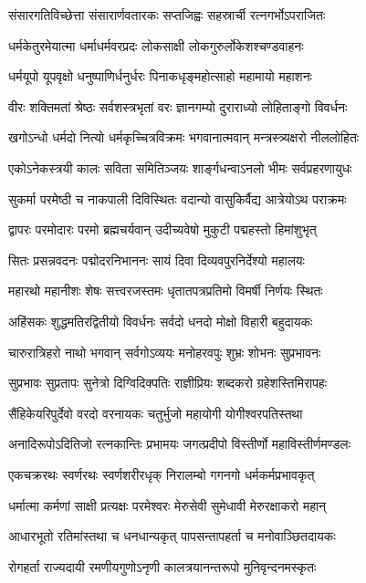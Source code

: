 \twolineshloka
{संसारगतिविच्छेत्ता संसारार्णवतारकः}
{सप्तजिह्वः सहस्रार्ची रत्नगर्भोऽपराजितः}%

\twolineshloka
{धर्मकेतुरमेयात्मा धर्माधर्मवरप्रदः}
{लोकसाक्षी लोकगुरुर्लोकेशश्चण्डवाहनः}%

\twolineshloka
{धर्मयूपो यूपवृक्षो धनुष्पाणिर्धनुर्धरः}
{पिनाकधृङ्महोत्साहो महामायो महाशनः}%

\twolineshloka
{वीरः शक्तिमतां श्रेष्ठः सर्वशस्त्रभृतां वरः}
{ज्ञानगम्यो दुराराध्यो लोहिताङ्गो विवर्धनः}%

\twolineshloka
{खगोऽन्धो धर्मदो नित्यो धर्मकृच्चित्रविक्रमः}
{भगवानात्मवान् मन्त्रस्त्र्यक्षरो नीललोहितः}%

\twolineshloka
{एकोऽनेकस्त्रयी कालः सविता समितिञ्जयः}
{शार्ङ्गधन्वाऽनलो भीमः सर्वप्रहरणायुधः}%

\twolineshloka
{सुकर्मा परमेष्ठी च नाकपाली दिविस्थितः}
{वदान्यो वासुकिर्वैद्य आत्रेयोऽथ पराक्रमः}%

\twolineshloka
{द्वापरः परमोदारः परमो ब्रह्मचर्यवान्}
{उदीच्यवेषो मुकुटी पद्महस्तो हिमांशुभृत्}%

\twolineshloka
{सितः प्रसन्नवदनः पद्मोदरनिभाननः}
{सायं दिवा दिव्यवपुरनिर्देश्यो महालयः}%

\twolineshloka
{महारथो महानीशः शेषः सत्त्वरजस्तमः}
{धृतातपत्रप्रतिमो विमर्षी निर्णयः स्थितः}%

\twolineshloka
{अहिंसकः शुद्धमतिरद्वितीयो विवर्धनः}
{सर्वदो धनदो मोक्षो विहारी बहुदायकः}%

\twolineshloka
{चारुरात्रिहरो नाथो भगवान् सर्वगोऽव्ययः}
{मनोहरवपुः शुभ्रः शोभनः सुप्रभावनः}%

\twolineshloka
{सुप्रभावः सुप्रतापः सुनेत्रो दिग्विदिक्पतिः}
{राज्ञीप्रियः शब्दकरो ग्रहेशस्तिमिरापहः}%

\twolineshloka
{सैंहिकेयरिपुर्देवो वरदो वरनायकः}
{चतुर्भुजो महायोगी योगीश्वरपतिस्तथा}%

\twolineshloka
{अनादिरूपोऽदितिजो रत्नकान्तिः प्रभामयः}
{जगत्प्रदीपो विस्तीर्णो महाविस्तीर्णमण्डलः}%

\twolineshloka
{एकचक्ररथः स्वर्णरथः स्वर्णशरीरधृक्}
{निरालम्बो गगनगो धर्मकर्मप्रभावकृत्}%

\twolineshloka
{धर्मात्मा कर्मणां  साक्षी प्रत्यक्षः परमेश्वरः}
{मेरुसेवी सुमेधावी मेरुरक्षाकरो महान्}%

\twolineshloka
{आधारभूतो रतिमांस्तथा च धनधान्यकृत्}
{पापसन्तापहर्ता च मनोवाञ्छितदायकः}%

\twolineshloka
{रोगहर्ता राज्यदायी रमणीयगुणोऽनृणी}
{कालत्रयानन्तरूपो मुनिवृन्दनमस्कृतः}%

